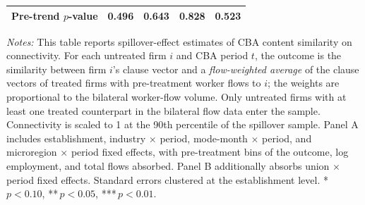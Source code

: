 \begin{table}[H]
\begin{tabular}{lcccc}
Pre-trend $p$-value & 0.496 & 0.643 & 0.828 & 0.523 \\
\hline\hline
\end{tabular}
\begin{minipage}{\linewidth}
\smallskip
\scriptsize\textit{Notes:} This table reports spillover-effect estimates of CBA content similarity on connectivity. For each untreated firm $i$ and CBA period $t$, the outcome is the similarity between firm $i$'s clause vector and a \emph{flow-weighted average} of the clause vectors of treated firms with pre-treatment worker flows to $i$; the weights are proportional to the bilateral worker-flow volume. Only untreated firms with at least one treated counterpart in the bilateral flow data enter the sample. Connectivity is scaled to 1 at the 90th percentile of the spillover sample. Panel A includes establishment, industry $\times$ period, mode-month $\times$ period, and microregion $\times$ period fixed effects, with pre-treatment bins of the outcome, log employment, and total flows absorbed. Panel B additionally absorbs union $\times$ period fixed effects. Standard errors clustered at the establishment level. *\,$p<0.10$, **\,$p<0.05$, ***\,$p<0.01$.
\end{minipage}
\end{table}
